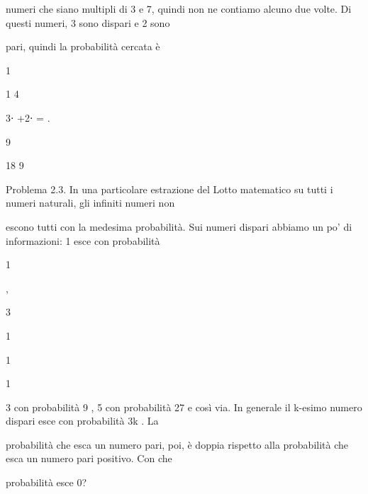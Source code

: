 \documentclass[a4paper,portrait,12pt]{article}
\begin{document}
\begin{flushleft}
numeri che siano multipli di 3 e 7, quindi non ne contiamo alcuno due volte. Di questi numeri, 3 sono dispari e 2 sono
\end{flushleft}


\begin{flushleft}
pari, quindi la probabilit\`{a} cercata \`{e}
\end{flushleft}


1


1 4


3⋅ +2⋅ = .


9


18 9


\begin{flushleft}
Problema 2.3. In una particolare estrazione del Lotto matematico su tutti i numeri naturali, gli infiniti numeri non
\end{flushleft}


\begin{flushleft}
escono tutti con la medesima probabilit\`{a}. Sui numeri dispari abbiamo un po' di informazioni: 1 esce con probabilit\`{a}
\end{flushleft}


1


,


3





1





1





1





\begin{flushleft}
3 con probabilit\`{a} 9 , 5 con probabilit\`{a} 27 e così via. In generale il k-esimo numero dispari esce con probabilit\`{a} 3k . La
\end{flushleft}


\begin{flushleft}
probabilit\`{a} che esca un numero pari, poi, \`{e} doppia rispetto alla probabilit\`{a} che esca un numero pari positivo. Con che
\end{flushleft}


\begin{flushleft}
probabilit\`{a} esce 0?
\end{flushleft}
\end{document}
